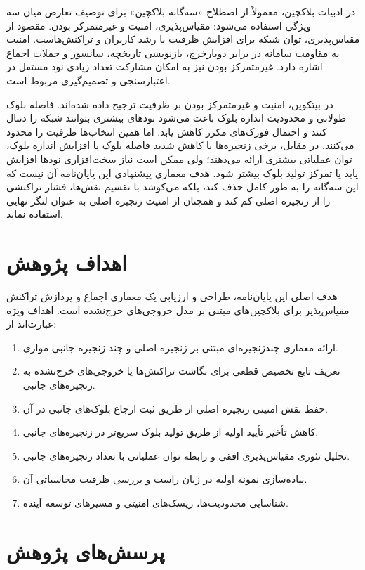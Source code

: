 در ادبیات بلاکچین، معمولاً از اصطلاح «سه‌گانه بلاکچین» برای توصیف تعارض میان سه ویژگی استفاده می‌شود: مقیاس‌پذیری، امنیت و غیرمتمرکز بودن. مقصود از مقیاس‌پذیری، توان شبکه برای افزایش ظرفیت با رشد کاربران و تراکنش‌هاست. امنیت به مقاومت سامانه در برابر دوبارخرج، بازنویسی تاریخچه، سانسور و حملات اجماع اشاره دارد. غیرمتمرکز بودن نیز به امکان مشارکت تعداد زیادی نود مستقل در اعتبارسنجی و تصمیم‌گیری مربوط است.

در بیتکوین، امنیت و غیرمتمرکز بودن بر ظرفیت ترجیح داده شده‌اند. فاصله بلوک طولانی و محدودیت اندازه بلوک باعث می‌شود نودهای بیشتری بتوانند شبکه را دنبال کنند و احتمال فورک‌های مکرر کاهش یابد. اما همین انتخاب‌ها ظرفیت را محدود می‌کنند. در مقابل، برخی زنجیره‌ها با کاهش شدید فاصله بلوک یا افزایش اندازه بلوک، توان عملیاتی بیشتری ارائه می‌دهند؛ ولی ممکن است نیاز سخت‌افزاری نودها افزایش یابد یا تمرکز تولید بلوک بیشتر شود. هدف معماری پیشنهادی این پایان‌نامه آن نیست که این سه‌گانه را به طور کامل حذف کند، بلکه می‌کوشد با تقسیم نقش‌ها، فشار تراکنشی را از زنجیره اصلی کم کند و همچنان از امنیت زنجیره اصلی به عنوان لنگر نهایی استفاده نماید.

\section{اهداف پژوهش}

هدف اصلی این پایان‌نامه، طراحی و ارزیابی یک معماری اجماع و پردازش تراکنش مقیاس‌پذیر برای بلاکچین‌های مبتنی بر مدل خروجی‌های خرج‌نشده است. اهداف ویژه عبارت‌اند از:

\begin{enumerate}
\item ارائه معماری چندزنجیره‌ای مبتنی بر زنجیره اصلی و چند زنجیره جانبی موازی.
\item تعریف تابع تخصیص قطعی برای نگاشت تراکنش‌ها یا خروجی‌های خرج‌نشده به زنجیره‌های جانبی.
\item حفظ نقش امنیتی زنجیره اصلی از طریق ثبت ارجاع بلوک‌های جانبی در آن.
\item کاهش تأخیر تأیید اولیه از طریق تولید بلوک سریع‌تر در زنجیره‌های جانبی.
\item تحلیل تئوری مقیاس‌پذیری افقی و رابطه توان عملیاتی با تعداد زنجیره‌های جانبی.
\item پیاده‌سازی نمونه اولیه در زبان راست و بررسی ظرفیت محاسباتی آن.
\item شناسایی محدودیت‌ها، ریسک‌های امنیتی و مسیرهای توسعه آینده.
\end{enumerate}

\section{پرسش‌های پژوهش}

